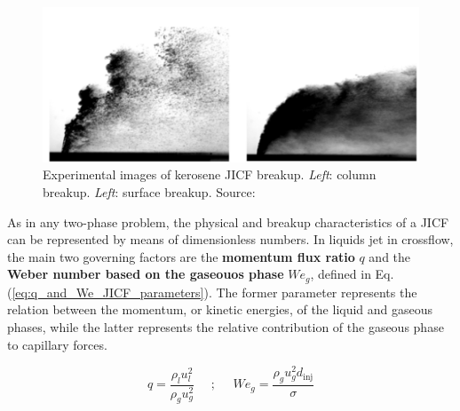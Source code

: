 \begin{figure}[h!]
	\centering
	\includegraphics[scale=0.65]{./part0_intro/JICF_breakup-mechanisms_freitag}
	\caption[Experimental images of kerosene JICF breakup]{Experimental images of kerosene JICF breakup. \textsl{Left}: column breakup. \textsl{Left}: surface breakup. Source: }
	\label{fig:JICF_breakup_mechanisms_freitag}
\end{figure}

As in any two-phase problem, the physical and breakup characteristics of a JICF can be represented by means of dimensionless numbers. In liquids jet in crossflow, the main two governing factors are the \textbf{momentum flux ratio} $q$ and the \textbf{Weber number based on the gaseouos phase} $We_g$, defined in Eq. (\ref{eq:q_and_We_JICF_parameters}). The former parameter represents the relation between the momentum, or kinetic energies, of the liquid and gaseous phases, while the latter represents the relative contribution of the gaseous phase to capillary forces. 

\begin{equation}
\label{eq:q_and_We_JICF_parameters}
	q = \frac{\rho_l u_l^2}{\rho_g u_g^2} ~~~~~~ ;  ~~~~~~ We_g = \frac{\rho_g u_g^2 d_\mathrm{inj}}{\sigma}
\end{equation}


